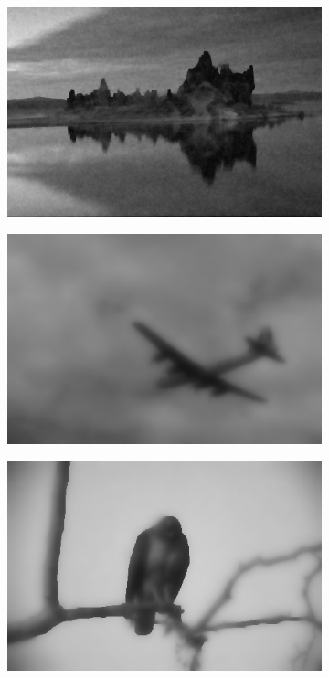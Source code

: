 \documentclass[onecolumn,final,a4paper,13pt,reqno]{siamart}
\begin{document}
\begin{figure}[h]
\begin{subfigure}[t]{0.19\textwidth}
	\end{subfigure}
	\begin{subfigure}[t]{0.19\textwidth}
		\includegraphics[scale=0.175]{pictures/denoising/image/143090_ipiano_absolute.png}
	\end{subfigure}
	\begin{subfigure}[t]{0.19\textwidth}
		\includegraphics[scale=0.175]{pictures/denoising/image/3096_ipiano_squared.png}
	\end{subfigure}
	\begin{subfigure}[t]{0.19\textwidth}
		\includegraphics[scale=0.175]{pictures/denoising/image/42049_ipiano_squared.png}

\end{subfigure}
\end{figure}
\end{document}
